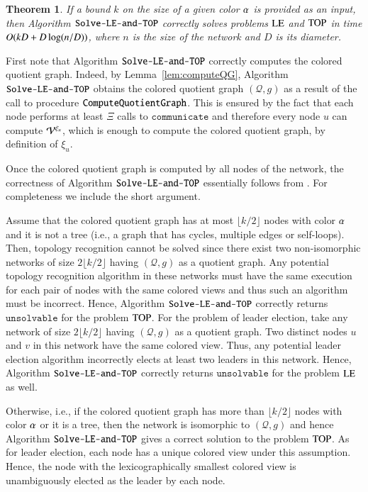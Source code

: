 \documentclass[a4paper,10pt]{article}
\newtheorem{theorem}{Theorem}[section]
\newcommand{\view}[1][]{\if!#1!\mathcal{V}\else\mathcal{V}^{#1}\fi}
\newcommand{\cQ}{\mathcal{Q}}
\newcommand{\commonTime}[1]{\xi_{#1}}
\newcommand{\commonTimeMax}{\Xi}
\newcommand{\algorithmMain}{\textup{\texttt{Solve-LE-and-TOP}}}
\newcommand{\algorithmQuotient}{\textup{\texttt{ComputeQuotientGraph}}}
\newcommand{\returnFailure}{\texttt{{unsolvable}}}
\newcommand{\communicate}{\texttt{communicate}}
\newcommand{\problemLE}{\textup{LE}}
\newcommand{\problemTOP}{\textup{TOP}}
\newenvironment{proof}[1][Proof]
{\par\noindent{\bf #1:} }{\hspace*{\fill}\nolinebreak{$\Box$}\bigskip\par}
\begin{document}
\begin{theorem} \label{thm:main}
If a bound $k$ on the size of a given color $\alpha$ is provided as an input, then Algorithm $\algorithmMain$ correctly solves problems $\problemLE$ and $\problemTOP$ in time $O(kD+D\log(n/D))$, where $n$ is the size of the network and $D$ is its diameter.
\end{theorem}
\begin{proof}
First note that Algorithm $\algorithmMain$ correctly computes the colored quotient graph.
Indeed, by Lemma~\ref{lem:computeQG}, Algorithm $\algorithmMain$ obtains the colored quotient graph $(\cQ,g)$ as a result of the call to procedure $\algorithmQuotient$.
This is ensured by the fact that each node performs at least $\commonTimeMax$ calls to $\communicate$ and therefore every node $u$ can compute $\view[\commonTime{u}]$, which is enough to compute the colored quotient graph, by definition of $\commonTime{u}$.

Once the colored quotient graph is computed by all nodes of the network, the correctness of Algorithm $\algorithmMain$ essentially follows from \cite{YK3}.
For completeness we include the short argument.

Assume that the colored quotient graph has at most $\lfloor k/2\rfloor$ nodes with color $\alpha$ and it is not a tree (i.e., a graph {that has} cycles, multiple edges or self-loops).
Then, topology recognition cannot be solved since there exist two non-isomorphic networks of size $2\lfloor k/2\rfloor$ having $(\cQ,g)$ as a quotient graph.
Any potential topology recognition algorithm in these networks must have the same execution for each pair of nodes with the same colored views and thus such an algorithm must be incorrect.
Hence, Algorithm $\algorithmMain$ correctly returns $\returnFailure$ for the problem $\problemTOP$.
For the problem of leader election, take any network of size $2\lfloor k/2\rfloor$ having $(\cQ,g)$ as a quotient graph.
Two distinct nodes $u$ and $v$ in this network have the same colored view.
Thus, any potential leader election algorithm incorrectly elects at least two leaders in this network.
Hence, Algorithm $\algorithmMain$ correctly returns $\returnFailure$ for the problem $\problemLE$ as well.


Otherwise, i.e., if the colored quotient graph has more than $\lfloor k/2\rfloor$ nodes with color $\alpha$ or it is a tree, then the network is isomorphic to $(\cQ,g)$ and hence Algorithm $\algorithmMain$ gives a correct solution to the problem $\problemTOP$.
As for leader election, each node has a unique colored view under this assumption.
Hence, the node with the lexicographically smallest colored view is unambiguously elected as the leader by each node.


\end{proof}
\end{document}
